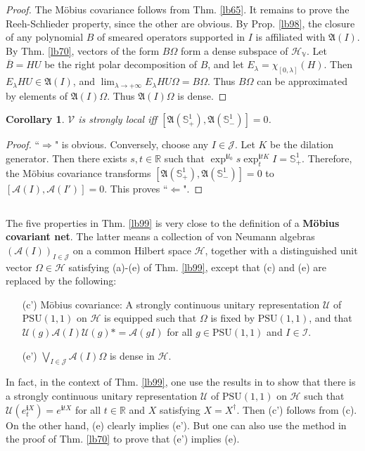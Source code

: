 \documentclass[12pt,b5paper,notitlepage]{article}
\theoremstyle{definition}
\theoremstyle{plain}
\newtheorem{co}[df]{Corollary}
\newcommand{\fk}{\mathfrak}
\newcommand{\mc}{\mathcal}
\newcommand{\ovl}{\overline}
\newcommand{\PSU}{\mathrm{PSU}(1,1)}
\newcommand{\im}{\mathbf{i}}
\newcommand{\Rbb}{\mathbb R}
\newcommand{\Sbb}{{\mathbb S}}
\newcommand{\HV}{\mathcal H_{\mathbb V}}
\newcommand{\MV}{\mathcal V}
\numberwithin{equation}{section}
\begin{document}
\begin{proof}
The M\"obius covariance follows from Thm. \ref{lb65}. It remains to prove the Reeh-Schlieder property, since the other are obvious. By Prop. \ref{lb98}, the closure of any polynomial $B$ of smeared operators supported in $I$ is affiliated with $\fk A(I)$. By Thm. \ref{lb70}, vectors of the form $B\Omega$ form a dense subspace of $\HV$. Let $\ovl B=HU$ be the right polar decomposition of $B$, and let $E_\lambda=\chi_{[0,\lambda]}(H)$. Then $E_\lambda HU\in\fk A(I)$, and $\lim_{\lambda\rightarrow+\infty}E_\lambda HU\Omega=B\Omega$. Thus $B\Omega$ can be approximated by elements of $\fk A(I)\Omega$. Thus $\fk A(I)\Omega$ is dense.
\end{proof}


\begin{co}
$\MV$ is strongly local iff $[\fk A(\Sbb^1_+),\fk A(\Sbb^1_-)]=0$.
\end{co}

\begin{proof}
``$\Rightarrow$" is obvious. Conversely, choose any $I\in\mc J$. Let $K$ be the dilation generator. Then there exists $s,t\in\Rbb$ such that $\exp^{\im l_0}s\exp^{\im tK}_tI=\Sbb^1_+$. Therefore, the M\"obius covariance transforms $[\fk A(\Sbb^1_+),\fk A(\Sbb^1_-)]=0$ to $[\mc A(I),\mc A(I')]=0$. This proves ``$\Leftarrow$".
\end{proof}



\subsection{}


The five properties in Thm. \ref{lb99} is very close to the definition of a \textbf{M\"obius covariant net}. The latter means a collection of von Neumann algebras $(\mc A(I))_{I\in\mc J}$ on a common Hilbert space $\mc H$, together with a distinguished unit vector $\Omega\in\mc H$ satisfying (a)-(e) of Thm. \ref{lb99}, except that (c) and (e) are replaced by the following:
\begin{enumerate}
\item[(c')] M\"obius covariance: A strongly continuous unitary representation $\mc U$ of $\PSU$ on $\mc H$ is equipped such that $\Omega$ is fixed by $\PSU$, and that $\mc U(g)\mc A(I)\mc U(g)*=\mc A(gI)$ for all $g\in\PSU$ and $I\in\mc I$.
\item[(e')] $\bigvee_{I\in\mc J}\mc A(I)\Omega$ is dense in $\mc H$. 
\end{enumerate}
In fact, in the context of Thm. \ref{lb99}, one use the results in \cite{Tol99} to show that there is a strongly continuous unitary representation $\mc U$ of $\PSU$ on $\mc H$ such that $\mc U(e^{\im X}_t)=e^{\im tX}$ for all $t\in\Rbb$ and $X$ satisfying $X=X^\dagger$. Then (c') follows from (c). On the other hand, (e) clearly implies (e'). But one can also use the method in the proof of Thm. \ref{lb70} to prove that (e') implies (e).
\end{document}
